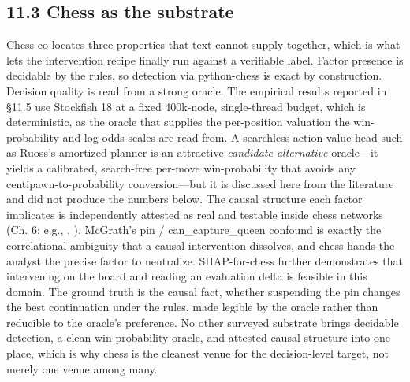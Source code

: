 \documentclass[conference]{IEEEtran}
\begin{document}
\subsection*{11.3 Chess as the substrate}
Chess co-locates three properties that text cannot supply together, which is what lets the intervention recipe finally run against a verifiable label. Factor presence is decidable by the rules, so detection via python-chess is exact by construction. Decision quality is read from a strong oracle. The empirical results reported in \S{}11.5 use Stockfish 18 at a fixed 400k-node, single-thread budget, which is deterministic, as the oracle that supplies the per-position valuation the win-probability and log-odds scales are read from. A searchless action-value head such as Ruoss's amortized planner \cite{ref7} is an attractive \textit{candidate alternative} oracle---it yields a calibrated, search-free per-move win-probability that avoids any centipawn-to-probability conversion---but it is discussed here from the literature and did not produce the numbers below. The causal structure each factor implicates is independently attested as real and testable inside chess networks (Ch. 6; e.g., \cite{ref4}, \cite{ref6}). McGrath's pin / can\_capture\_queen confound \cite{ref1} is exactly the correlational ambiguity that a causal intervention dissolves, and chess hands the analyst the precise factor to neutralize. SHAP-for-chess \cite{ref19} further demonstrates that intervening on the board and reading an evaluation delta is feasible in this domain. The ground truth is the causal fact, whether suspending the pin changes the best continuation under the rules, made legible by the oracle rather than reducible to the oracle's preference. No other surveyed substrate brings decidable detection, a clean win-probability oracle, and attested causal structure into one place, which is why chess is the cleanest venue for the decision-level target, not merely one venue among many.
\end{document}
